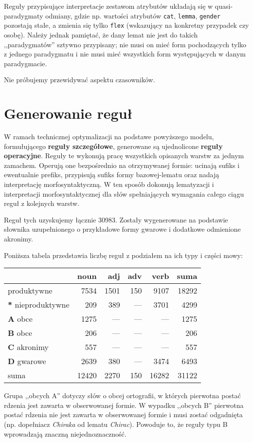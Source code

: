 \documentclass{article}
\begin{document}
Reguły przypisujące interpretacje zestawom atrybutów układają się w quasi-paradygmaty odmiany,
gdzie np. wartości atrybutów \texttt{cat}, \texttt{lemma}, \texttt{gender} pozostają stałe,
a zmienia się tylko \texttt{flex} (wskazujący na konkretny przypadek czy osobę).
Należy jednak pamiętać, że dany lemat nie jest do takich ,,paradygmatów'' sztywno przypisany;
nie musi on mieć form pochodzących tylko z jednego paradygmatu
i nie musi mieć wszystkich form występujących w danym paradygmacie.

Nie próbujemy przewidywać aspektu czasowników.

\section{Generowanie reguł}
W ramach technicznej optymalizacji na podstawe powyższego modelu, formułującego \textbf{reguły szczegółowe}, generowane są ujednolicone \textbf{reguły operacyjne}.
Reguły te wykonują pracę wszystkich opisanych warstw za jednym zamachem.
Operują one bezpośrednio na otrzymywanej formie: ucinają sufiks i ewentualnie prefiks, przypisują sufiks formy bazowej-lematu oraz nadają interpretację morfosyntaktyczną.
W ten sposób dokonują lematyzacji i interpretacji morfosyntaktycznej dla słów spełniających wymagania całego ciągu reguł z kolejnych warstw.

Reguł tych uzyskujemy łącznie 30983. Zostały wygenerowane na podstawie słownika uzupełnionego o przykładowe formy gwarowe i dodatkowe odmienione akronimy.

Poniższa tabela przedstawia liczbę reguł z podziałem na ich typy i części mowy:
\begin{center}
\begin{tabular}{l|r|r|r|r|r}
                              &  noun &  adj & adv &  verb &  suma \\
\hline
	           produktywne    &  7534 & 1501 & 150 &  9107 & 18292 \\
\hline
	\textbf{*} nieproduktywne &   209 &  389 & --- &  3701 &  4299 \\
\hline
	\textbf{A} obce           &  1275 &  --- & --- &   --- &  1275 \\
\hline
	\textbf{B} obce           &   206 &  --- & --- &   --- &   206 \\
\hline
	\textbf{C} akronimy       &   557 &  --- & --- &   --- &   557 \\
\hline
	\textbf{D} gwarowe        &  2639 &  380 & --- &  3474 &  6493 \\
\hline
	         suma             & 12420 & 2270 & 150 & 16282 & 31122 \\
\end{tabular}
\end{center}
Grupa ,,obcych A'' dotyczy słów o obcej ortografii, w których pierwotna postać rdzenia jest zawarta w obserwowanej formie.
W wypadku ,,obcych B'' pierwotna postać rdzenia nie jest zawarta w obserwowanej formie i musi zostać odgadnięta (np. dopełniacz \textit{Chiraka} od lematu \textit{Chirac}).
Powoduje to, że reguły typu B wprowadzają znaczną niejednoznaczność.
\end{document}
